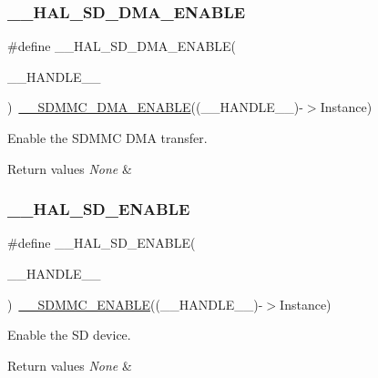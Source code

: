 \subsubsection{\texorpdfstring{\_\_HAL\_SD\_DMA\_ENABLE}{\_\_HAL\_SD\_DMA\_ENABLE}}
{\footnotesize\ttfamily \#define \+\_\+\+\_\+\+H\+A\+L\+\_\+\+S\+D\+\_\+\+D\+M\+A\+\_\+\+E\+N\+A\+B\+LE(\begin{DoxyParamCaption}\item[{}]{\+\_\+\+\_\+\+H\+A\+N\+D\+L\+E\+\_\+\+\_\+ }\end{DoxyParamCaption})~\mbox{\hyperlink{group___s_d_m_m_c___l_l___interrupt___clock_ga57d82a8c4be7b1dc8d2ff4cae11c2339}{\+\_\+\+\_\+\+S\+D\+M\+M\+C\+\_\+\+D\+M\+A\+\_\+\+E\+N\+A\+B\+LE}}((\+\_\+\+\_\+\+H\+A\+N\+D\+L\+E\+\_\+\+\_\+)-\/$>$Instance)}



Enable the S\+D\+M\+MC D\+MA transfer. 


\begin{DoxyRetVals}{Return values}
{\em None} & \\
\hline
\end{DoxyRetVals}
\mbox{\label{group___s_d___exported__macros_ga0c4d9ae5d5b41bae000b7911ed510223}} 
\subsubsection{\texorpdfstring{\_\_HAL\_SD\_ENABLE}{\_\_HAL\_SD\_ENABLE}}
{\footnotesize\ttfamily \#define \+\_\+\+\_\+\+H\+A\+L\+\_\+\+S\+D\+\_\+\+E\+N\+A\+B\+LE(\begin{DoxyParamCaption}\item[{}]{\+\_\+\+\_\+\+H\+A\+N\+D\+L\+E\+\_\+\+\_\+ }\end{DoxyParamCaption})~\mbox{\hyperlink{group___s_d_m_m_c___l_l___interrupt___clock_ga20f2287a3097b96bd7e020919a4d0057}{\+\_\+\+\_\+\+S\+D\+M\+M\+C\+\_\+\+E\+N\+A\+B\+LE}}((\+\_\+\+\_\+\+H\+A\+N\+D\+L\+E\+\_\+\+\_\+)-\/$>$Instance)}



Enable the SD device. 


\begin{DoxyRetVals}{Return values}
{\em None} & \\
\hline
\end{DoxyRetVals}
\mbox{\label{group___s_d___exported__macros_ga69399cf68d9099677b6d13b29da85a3a}} 
